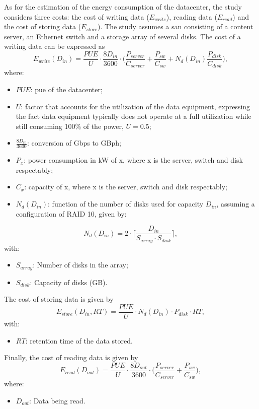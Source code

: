 As for the estimation of the energy consumption of the datacenter, the study considers three costs: the cost of writing data ($E_{write}$), reading data ($E_{read}$) and the cost of storing data ($E_{store}$). The study assumes a \ac{san} consisting of a content server, an Ethernet switch and a storage array of several disks. The cost of a writing data can be expressed as
%
\begin{equation}
\label{formula:tall_datacenter_write}
    E_{write}(D_{in}) = \frac{PUE}{U} \cdot \frac{8D_{in}}{3600} \cdot \bigg(\frac{P_{server}}{C_{server}} + \frac{P_{sw}}{C_{sw}} + N_d(D_{in}) \frac{P_{disk}}{C_{disk}}  \bigg), 
\end{equation}
%
where:
\begin{itemize}
    \item $PUE$: \ac{pue} of the datacenter;
    \item $U$: factor that accounts for the utilization of the data equipment, expressing the fact data equipment typically does not operate at a full utilization while still consuming 100\% of the power, $U = 0.5$;
    \item $\frac{8D_{in}}{3600}$: conversion of Gbps to GBph;
    \item $P_x$: power consumption in kW of x, where x is the server, switch and disk respectably;
    \item $C_x$: capacity of x, where x is the server, switch and disk respectably;
    \item $N_d(D_{in})$: function of the number of disks used for capacity $D_{in}$, assuming a configuration of RAID 10, given by: 
\end{itemize}
%
\begin{equation}
\label{formula:tall_datacenter_ndisks}
    N_d(D_{in}) = 2 \cdot \bigg \lceil \frac{D_{in}}{S_{array} \cdot S_{disk}} \bigg \rceil,
\end{equation}
with:
\begin{itemize}
    \item $S_{array}$: Number of disks in the array;
    \item $S_{disk}$: Capacity of disks (GB).
\end{itemize}
%
The cost of storing data is given by
\begin{equation}
\label{formula:tall_datacenter_store}
    E_{store}(D_{in}, RT) = \frac{PUE}{U} \cdot N_d(D_{in}) \cdot P_{disk} \cdot RT,
\end{equation}
with:
\begin{itemize}
    \item $RT$: retention time of the data stored.
\end{itemize}
Finally, the cost of reading data is given by
\begin{equation}
\label{formula:tall_datacenter_read}
    E_{read}(D_{out}) = \frac{PUE}{U} \cdot \frac{8D_{out}}{3600} \cdot \bigg(\frac{P_{server}}{C_{server}} + \frac{P_{sw}}{C_{sw}}  \bigg),
\end{equation}
where:
\begin{itemize}
    \item $D_{out}$: Data being read.
\end{itemize}

